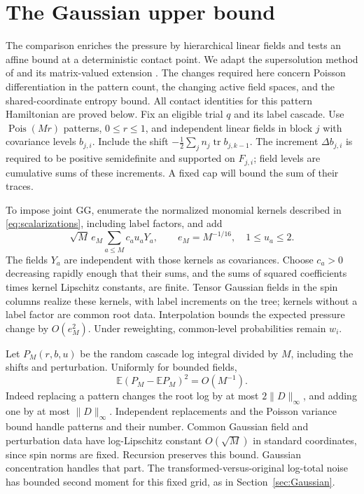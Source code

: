 \documentclass[11pt]{article}
\numberwithin{equation}{section}
\theoremstyle{definition}
\newcommand{\E}{\mathbb E}
\newcommand{\tr}{\operatorname{tr}}
\newcommand{\Pois}{\operatorname{Pois}}
\newcommand{\norm}[1]{\lVert #1\rVert}
\begin{document}
\section{The Gaussian upper bound}
\label{sec:upper}
The comparison enriches the pressure by hierarchical linear fields and tests an affine bound at a deterministic contact point. We adapt the supersolution method of \cite[Theorem~4.1]{Mourrat2021} and its matrix-valued extension \cite[Proposition~5.1]{Mourrat2023}. The changes required here concern Poisson differentiation in the pattern count, the changing active field spaces, and the shared-coordinate entropy bound. All contact identities for this pattern Hamiltonian are proved below.
Fix an eligible trial $q$ and its label cascade. Use $\Pois(Mr)$ patterns, $0\le r\le1$, and independent linear fields in block $j$ with covariance levels $b_{j,i}$. Include the shift $-\frac12\sum_jn_j\tr b_{j,k-1}$. The increment $\Delta b_{j,i}$ is required to be positive semidefinite and supported on $F_{j,i}$; field levels are cumulative sums of these increments. A fixed cap will bound the sum of their traces.

To impose joint GG, enumerate the normalized monomial kernels described in \eqref{eq:scalarizations}, including label factors, and add
\begin{equation}\label{eq:upperperturb}
\sqrt M\,e_M\sum_{a\le M}c_a u_aY_a,
\qquad e_M=M^{-1/16},\quad 1\le u_a\le2.
\end{equation}
The fields $Y_a$ are independent with those kernels as covariances. Choose $c_a>0$ decreasing rapidly enough that their sums, and the sums of squared coefficients times kernel Lipschitz constants, are finite. Tensor Gaussian fields in the spin columns realize these kernels, with label increments on the tree; kernels without a label factor are common root data. Interpolation bounds the expected pressure change by $O(e_M^2)$. Under reweighting, common-level probabilities remain $w_i$.

Let $P_M(r,b,u)$ be the random cascade log integral divided by $M$, including the shifts and perturbation. Uniformly for bounded fields,
\begin{equation}\label{eq:variance}
\E(P_M-\E P_M)^2=O(M^{-1}).
\end{equation}
Indeed replacing a pattern changes the root log by at most $2\norm D_\infty$, and adding one by at most $\norm D_\infty$. Independent replacements and the Poisson variance bound handle patterns and their number. Common Gaussian field and perturbation data have log-Lipschitz constant $O(\sqrt M)$ in standard coordinates, since spin norms are fixed. Recursion preserves this bound. Gaussian concentration handles that part. The transformed-versus-original log-total noise has bounded second moment for this fixed grid, as in Section~\ref{sec:Gaussian}.
\end{document}
